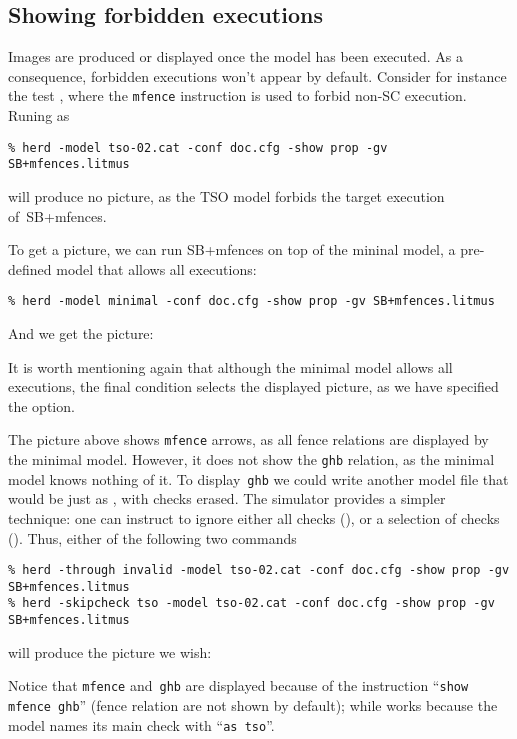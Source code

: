 \subsection{\label{show:forbidden}Showing forbidden executions}
Images are produced or displayed once the model has been executed.
As a consequence,
forbidden executions won't appear by default.
Consider for instance the test ,
where the \texttt{mfence} instruction is used to forbid
 non-SC execution. Runing \herd{} as
\begin{verbatim}
% herd -model tso-02.cat -conf doc.cfg -show prop -gv SB+mfences.litmus
\end{verbatim}
will produce no picture, as the TSO model forbids the target execution
of~\textsf{SB+mfences}.

To get a picture, we can run \textsf{SB+mfences} on top of the mininal
model, a pre-defined model that allows all executions:
\begin{verbatim}
% herd -model minimal -conf doc.cfg -show prop -gv SB+mfences.litmus
\end{verbatim}
And we get the picture:
\begin{center}\end{center}
It is worth mentioning again  that although the minimal model allows all
executions, the final condition
selects the displayed picture, as we have specified the
 option.


\label{name:check}The picture above shows \verb+mfence+ arrows, as all
fence relations are displayed by the minimal model.
However, it  does not show the \verb+ghb+ relation, as the minimal
model knows nothing of it.
To display~\verb+ghb+ we could write another model file that would be just as
, with checks erased.
The simulator \herd{} provides a simpler technique:
one can instruct \herd{} to ignore
either all checks (), or a selection of checks
().
Thus, either of the following two commands
\begin{verbatim}
% herd -through invalid -model tso-02.cat -conf doc.cfg -show prop -gv SB+mfences.litmus
% herd -skipcheck tso -model tso-02.cat -conf doc.cfg -show prop -gv SB+mfences.litmus
\end{verbatim}
will produce the picture we wish:
\begin{center}\end{center}
Notice that \verb+mfence+ and~\verb+ghb+ are displayed because
of the instruction ``\verb+show mfence ghb+'' (fence relation are not shown
by default);
while  works because the  model
names its main check with ``\verb+as tso+''.

